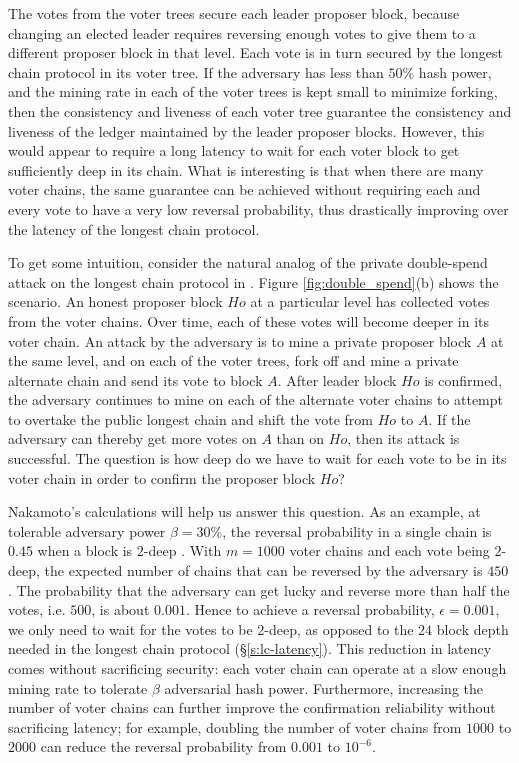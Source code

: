 
The votes from the voter trees secure each leader proposer block, because changing an elected leader requires reversing enough votes to give them to a different proposer block in that level. 
Each vote is in turn secured by the longest chain protocol in its voter tree. If the adversary has less than $50\%$ hash power, and the mining rate in each of the voter trees is kept small to minimize forking,  then the consistency and liveness of each voter tree guarantee the consistency and liveness of the ledger maintained by the leader proposer blocks. 
However, this would appear to require a long latency to wait for each voter block to get sufficiently deep in its chain. What is interesting is that when there are many voter chains, the same guarantee can be achieved without requiring each and every vote to have a very low reversal probability, thus drastically improving over the latency of the longest chain protocol. 


To get some intuition, consider the natural analog of the private double-spend attack on the longest chain protocol in \prism. Figure \ref{fig:double_spend}(b) shows the scenario. An honest proposer block $Ho$ at a particular level has collected votes from the voter chains. Over time, each of these votes will become deeper in its voter chain. An attack by the adversary is to mine a private proposer block $A$ at the same level, and on each of the voter trees, fork off and mine a private alternate chain and send its vote to block $A$. After leader block $Ho$ is confirmed, the adversary continues to mine on each of the alternate voter chains to attempt to overtake the public longest chain and shift the vote from $Ho$ to $A$. If the adversary can thereby get more votes on $A$ than on $Ho$, then its attack is successful. The question is how deep do we have to wait for each vote to be in its voter chain in order to confirm the proposer block $Ho$?

Nakamoto's calculations will help us answer this question. As an example, at tolerable adversary power $\beta = 30\%$, the reversal probability in a single chain is $0.45$ when a block is $2$-deep \cite{bitcoin}. With $m=1000$ voter chains and each vote being $2$-deep, the expected number of chains that can be reversed by the adversary is $450$. The probability that the adversary can get lucky and reverse more than half the votes, i.e. $500$, is about  $0.001$. Hence to achieve a reversal probability, $\epsilon = 0.001$, we only need to wait for the votes to be  $2$-deep, as opposed to the $24$ block depth needed in the longest chain protocol (\S\ref{s:lc-latency}). This reduction in latency comes without sacrificing security: each voter chain can operate at a slow enough mining rate to tolerate $\beta$ adversarial hash power. Furthermore, increasing the number of voter chains can further improve the confirmation reliability without sacrificing latency; for example, doubling the number of voter chains from $1000$ to $2000$ can reduce the reversal probability from $0.001$ to $10^{-6}$.

